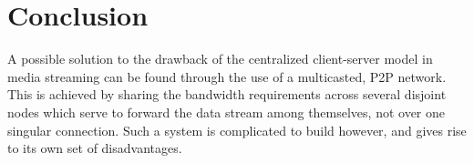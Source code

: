 \documentclass[fleqn,24pt]{SelfArx} %
\begin{document}
\section{Conclusion}

A possible solution to the drawback of the centralized client-server model in media streaming can be found through the use of a multicasted, P2P network. This is achieved by sharing the bandwidth requirements across several disjoint nodes which serve to forward the data stream among themselves, not over one singular connection. Such a system is complicated to build however, and gives rise to its own set of disadvantages.




\end{document}

